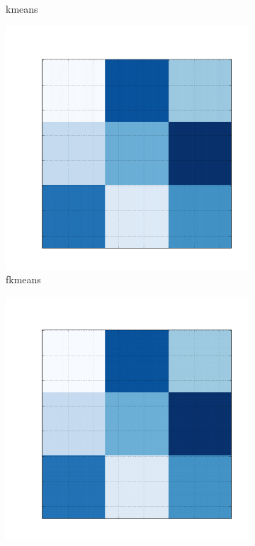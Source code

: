 \documentclass[10pt]{beamer}
\begin{document}
\begin{frame}
\begin{figure}[H]
\begin{subfigure}[b]{0.13\textwidth}
          \caption*{kmeans}
      \end{subfigure}
      \begin{subfigure}[b]{0.13\textwidth}
          \includegraphics[width=\textwidth]{img/c-reconstruction-fkmeans.png}
          \caption*{fkmeans}
      \end{subfigure}
      \begin{subfigure}[b]{0.13\textwidth}
          \includegraphics[width=\textwidth]{img/c-reconstruction-onmtf.png}

\end{subfigure}
\end{figure}
\end{frame}
\end{document}
